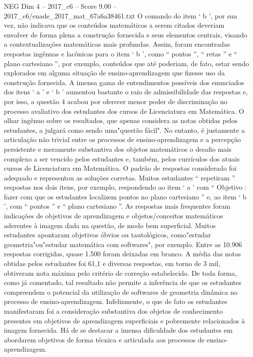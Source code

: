 \begin{textsample}{NEG Dim 4 – 2017\_c6 – Score 9.00 – 2017\_c6/enade\_2017\_mat\_67a6a38461.txt}
O comando do item ‘ b ’, por sua vez, não indicava que os conteúdos matemáticos a serem citados deveriam envolver de forma plena a construção fornecida e seus elementos centrais, visando a contextualizações matemáticas mais profundas.
Assim, foram encontradas respostas ingênuas e lacônicas para o item ‘ b ’, como “ pontos ”, “ retas ” e “ plano cartesiano ”, por exemplo, conteúdos que até poderiam, de fato, estar sendo explorados em alguma situação de ensino-aprendizagem que fizesse uso da construção fornecida.
A imensa gama de entendimentos possíveis dos enunciados dos itens ‘ a ’ e ‘ b ’ aumentou bastante o raio de admissibilidade das respostas e, por isso, a questão 4 acabou por oferecer menor poder de discriminação no processo avaliativo dos estudantes dos cursos de Licenciatura em Matemática.
O olhar ingênuo sobre os resultados, que apenas considera as notas obtidas pelos estudantes, a julgará como sendo uma"questão fácil".
No entanto, é justamente a articulação não trivial entre os processos de ensino-aprendizagem e a percepção persistente e meramente substantiva dos objetos matemáticos o desafio mais complexo a ser vencido pelos estudantes e, também, pelos currículos dos atuais cursos de Licenciatura em Matemática.
O padrão de respostas considerado foi adequado e representou as soluções corretas.
Muitos estudantes “ repetiram ” respostas nos dois itens, por exemplo, respondendo ao item ‘ a ’ com “ Objetivo : fazer com que os estudantes localizem pontos no plano cartesiano ” e, ao item ‘ b ’, com “ pontos ” e “ plano cartesiano ”.
As respostas mais frequentes foram indicações de objetivos de aprendizagem e objetos/conceitos matemáticos aderentes à imagem dada na questão, de modo bem superficial.
Muitos estudantes apontaram objetivos óbvios ou tautológicos, como"estudar geometria"ou"estudar matemática com softwares", por exemplo.
Entre as 10.906 respostas corrigidas, quase 1.500 foram deixadas em branco.
A média das notas obtidas pelos estudantes foi 61,1 e diversas respostas, em torno de 3 mil, obtiveram nota máxima pelo critério de correção estabelecido.
De toda forma, como já comentado, tal resultado não permite a inferência de que os estudantes compreendem o potencial da utilização de softwares de geometria dinâmica no processo de ensino-aprendizagem.
Infelizmente, o que de fato os estudantes manifestaram foi a consideração substantiva dos objetos de conhecimento presentes em objetivos de aprendizagem superficiais e pobremente relacionados à imagem fornecida.
Há de se destacar a imensa dificuldade dos estudantes em abordarem objetivos de forma técnica e articulada aos processos de ensino-aprendizagem.

\end{textsample}
